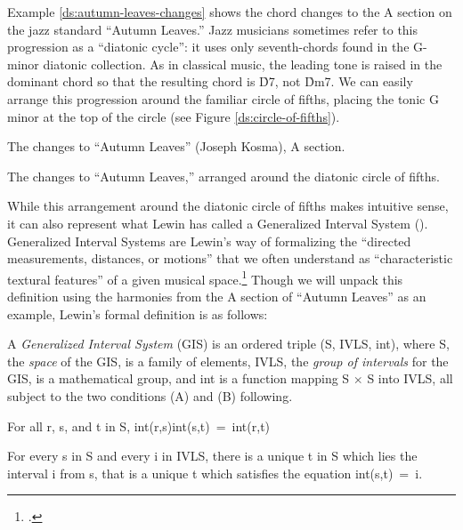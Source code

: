\documentclass[diss]{subfiles}
\begin{document}
Example \ref{ds:autumn-leaves-changes} shows the chord changes to the A section
on the jazz standard “Autumn Leaves.” Jazz musicians sometimes refer
to this progression as a “diatonic cycle”: it uses only seventh-chords found
in the G-minor diatonic collection. As in classical music, the leading
tone is raised in the dominant chord so that the resulting chord is \h{D7}, not
\h{Dm7}. We can easily arrange this progression around the familiar
circle of fifths, placing the tonic G minor at the top of the circle (see
Figure \ref{ds:circle-of-fifths}).

\exBeg[thbp]
  \caption{The changes to “Autumn Leaves” (Joseph Kosma), A section.}
  \label{ds:autumn-leaves-changes}
\exEnd

\figBeg[htbp]
  \caption{The changes to “Autumn Leaves,” arranged around the diatonic circle
    of fifths.}
  \label{ds:circle-of-fifths}
\figEnd

While this arrangement around the diatonic circle of fifths makes intuitive
sense, it can also represent what Lewin has called a Generalized Interval System
(\gis{}). Generalized Interval Systems are Lewin’s way of formalizing the
“directed measurements, distances, or motions” that we often understand as
“characteristic textural features” of a given musical
space.\footcite[16]{lewin:gmit} Though we will unpack this definition using
the harmonies from the A section of “Autumn Leaves” as an example, Lewin’s
formal definition is as follows:
\begin{quoting}
  \singlespacing
  A \emph{Generalized Interval System} (GIS) is an ordered triple (S, IVLS,
  int), where S, the \emph{space} of the GIS, is a family of elements, IVLS,
  the \emph{group of intervals} for the GIS, is a mathematical group, and int
  is a function mapping S $\times$ S into IVLS, all subject to the two
  conditions (A) and (B) following.
  \begin{compactenum}[(A): ]
    \item For all r, s, and t in S, \mbox{int(r,s)int(s,t) = int(r,t)}
    \item For every s in S and every i in IVLS, there is a unique t in S which
      lies the interval i from s, that is a unique t which satisfies the
      equation \mbox{int(s,t) = i}.
  \end{compactenum}
\end{quoting}
\end{document}
